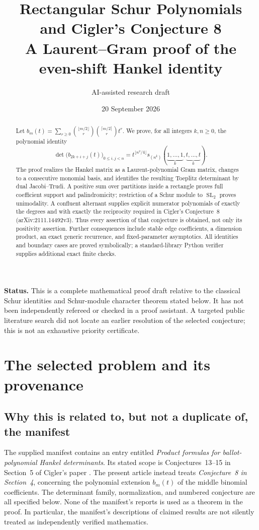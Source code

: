 \documentclass[11pt,a4paper]{article}
\title{\textbf{Rectangular Schur Polynomials\protect\\
and Cigler's Conjecture 8}\\[0.4em]
\large A Laurent--Gram proof of the even-shift Hankel identity}
\author{AI-assisted research draft}
\date{20 September 2026}
\theoremstyle{definition}
\theoremstyle{remark}
\newcommand{\SL}{\operatorname{SL}}
\numberwithin{equation}{section}
\begin{document}
\maketitle
\begin{abstract}
Let
\(b_m(t)=\sum_{r\ge0}\binom{\lfloor m/2\rfloor}{r}
\binom{\lceil m/2\rceil}{r}t^r\).
We prove, for all integers \(k,n\ge0\), the polynomial identity
\[
 \det\bigl(b_{2k+i+j}(t)\bigr)_{0\le i,j<n}
 =t^{\lfloor n^2/4\rfloor}
 s_{(n^k)}(\underbrace{1,\ldots,1}_{k},
                \underbrace{t,\ldots,t}_{k}).
\]
The proof realizes the Hankel matrix as a Laurent-polynomial Gram matrix,
changes to a consecutive monomial basis, and identifies the resulting
Toeplitz determinant by dual Jacobi--Trudi. A positive sum over partitions
inside a rectangle proves full coefficient support and palindromicity;
restriction of a Schur module to \(\SL_2\) proves unimodality. A confluent
alternant supplies explicit numerator polynomials of exactly the degrees and
with exactly the reciprocity required in Cigler's Conjecture~8
(arXiv:2111.14492v3). Thus every assertion of that conjecture is obtained,
not only its positivity assertion. Further consequences include stable edge
coefficients, a dimension product, an exact generic recurrence, and
fixed-parameter asymptotics. All identities and boundary cases are proved
symbolically; a standard-library Python verifier supplies additional exact
finite checks.
\end{abstract}

\medskip
\noindent\textbf{Status.}
This is a complete mathematical proof draft relative to the classical Schur
identities and Schur-module character theorem stated below. It has not been
independently refereed or checked in a proof assistant. A targeted public
literature search did not locate an earlier resolution of the selected
conjecture; this is not an exhaustive priority certificate.

\clearpage
\tableofcontents
\clearpage

\section{The selected problem and its provenance}
\label{sec:problem}

\subsection{Why this is related to, but not a duplicate of, the manifest}
The supplied manifest \cite{manifest} contains an entry entitled
\emph{Product formulas for ballot-polynomial Hankel determinants}. Its stated
scope is Conjectures~13--15 in Section~5 of Cigler's paper \cite{cigler}.
The present article instead treats \emph{Conjecture~8 in Section~4}, concerning
the polynomial extension \(b_m(t)\) of the middle binomial coefficients.
The determinant family, normalization, and numbered conjecture are all
specified below. None of the manifest's reports is used as a theorem in the
proof. In particular, the manifest's descriptions of claimed results are not
silently treated as independently verified mathematics.
\end{document}

